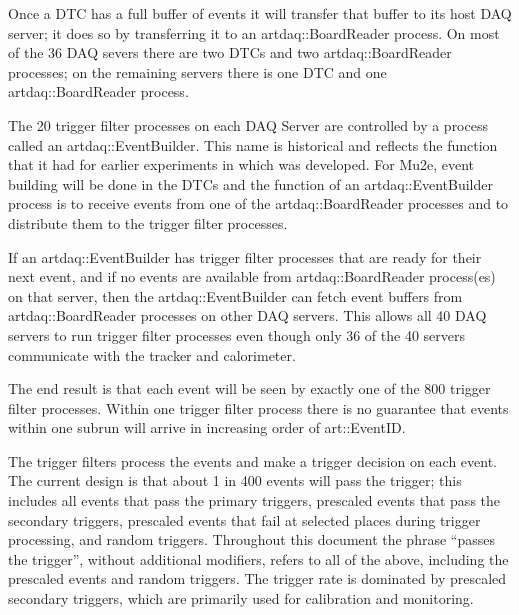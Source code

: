 Once a DTC has a full buffer of events it will transfer that buffer to its host DAQ server;
it does so by transferring it to an {\code artdaq::BoardReader} process.  On most of the
36 DAQ severs there are two DTCs and two {\code artdaq::BoardReader} processes;
on the remaining servers there is one DTC and one {\code artdaq::BoardReader} process.

The 20 trigger filter \art processes on each DAQ Server are controlled by a process
called an {\code artdaq::EventBuilder}.
This name is historical and reflects the function that it had for earlier experiments in which \artdaq was developed.
For Mu2e, event building will be done in the DTCs and the function of an
{\code artdaq::EventBuilder} process is to receive events from one of
the {\code artdaq::BoardReader} processes and to distribute them to the trigger filter \art processes.

If an {\code artdaq::EventBuilder} has trigger filter processes that are ready for their next event,
and if no events are available from {\code artdaq::BoardReader} process(es) on that server,
then the {\code artdaq::EventBuilder} can fetch event buffers from {\code artdaq::BoardReader} processes
on other DAQ servers.
This allows all 40 DAQ servers to run trigger filter processes even though only 36 of the 40 servers
communicate with the tracker and calorimeter.

The end result is that each event will be seen by exactly one of the 800 trigger filter processes.
Within one trigger filter process there is no guarantee that events within one subrun will arrive in
increasing order of {\code art::EventID}.


The trigger filters process the events and make a trigger decision on
each event.
The current design is that about 1 in 400 events will pass the trigger;
this includes all events that pass the primary triggers,
prescaled events that pass the secondary triggers,
prescaled events that fail at selected places during trigger processing,
and random triggers.
Throughout this document the phrase ``passes the trigger'', without additional modifiers,
refers to all of the above, including the prescaled events and random triggers.
The trigger rate is dominated by prescaled secondary triggers,
which are primarily used for calibration and monitoring.


